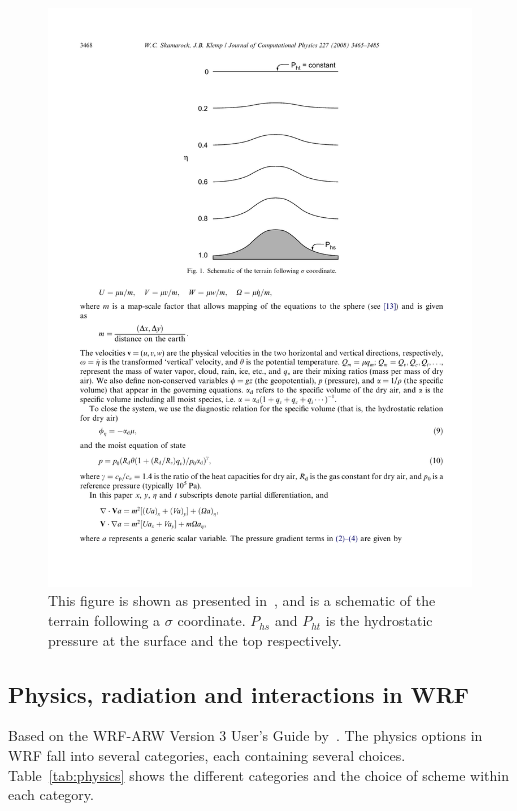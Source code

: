\begin{figure}
\centering
\includegraphics[scale=1]{model_methods/sigma.pdf}
\caption{This figure is shown as presented in~\cite{Skamarock2008}, and is a schematic of the terrain following a $\sigma$ coordinate. $P_{hs}$ and $P_{ht}$ is the hydrostatic pressure at the surface and the top respectively.}
\label{fig:sigma}
\end{figure}

\subsection{Physics, radiation and interactions in WRF}
Based on the WRF-ARW Version 3 User's Guide by~\cite{Wang2015}.
The physics options in WRF fall into several categories, each containing several choices. Table~\ref{tab:physics} shows the different categories and the choice of scheme within each category.


